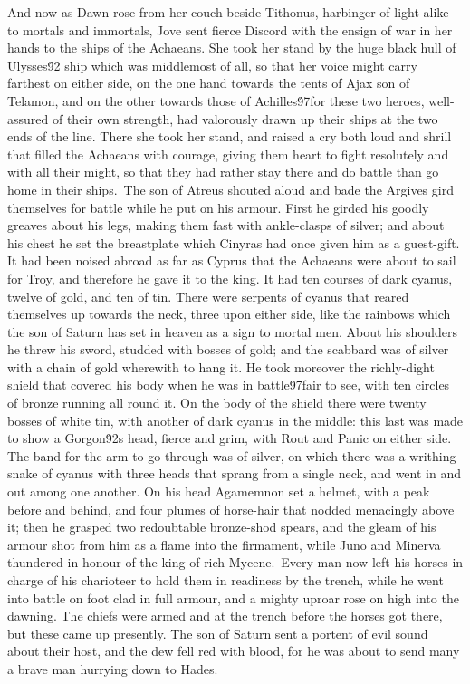 {  And now as Dawn rose from her couch beside Tithonus, harbinger of light alike to mortals and immortals, Jove sent fierce Discord with the ensign of war in her hands to the ships of the Achaeans. She took her stand by the huge black hull of Ulysses\'92 ship which was middlemost of all, so that her voice might carry farthest on either side, on the one hand towards the tents of Ajax son of Telamon, and on the other towards those of Achilles\'97for these two heroes, well-assured of their own strength, had valorously drawn up their ships at the two ends of the line. There she took her stand, and raised a cry both loud and shrill that filled the Achaeans with courage, giving them heart to fight resolutely and with all their might, so that they had rather stay there and do battle than go home in their ships.\
The son of Atreus shouted aloud and bade the Argives gird themselves for battle while he put on his armour. First he girded his goodly greaves about his legs, making them fast with ankle-clasps of silver; and about his chest he set the breastplate which Cinyras had once given him as a guest-gift. It had been noised abroad as far as Cyprus that the Achaeans were about to sail for Troy, and therefore he gave it to the king. It had ten courses of dark cyanus, twelve of gold, and ten of tin. There were serpents of cyanus that reared themselves up towards the neck, three upon either side, like the rainbows which the son of Saturn has set in heaven as a sign to mortal men. About his shoulders he threw his sword, studded with bosses of gold; and the scabbard was of silver with a chain of gold wherewith to hang it. He took moreover the richly-dight shield that covered his body when he was in battle\'97fair to see, with ten circles of bronze running all round it. On the body of the shield there were twenty bosses of white tin, with another of dark cyanus in the middle: this last was made to show a Gorgon\'92s head, fierce and grim, with Rout and Panic on either side. The band for the arm to go through was of silver, on which there was a writhing snake of cyanus with three heads that sprang from a single neck, and went in and out among one another. On his head Agamemnon set a helmet, with a peak before and behind, and four plumes of horse-hair that nodded menacingly above it; then he grasped two redoubtable bronze-shod spears, and the gleam of his armour shot from him as a flame into the firmament, while Juno and Minerva thundered in honour of the king of rich Mycene.\
Every man now left his horses in charge of his charioteer to hold them in readiness by the trench, while he went into battle on foot clad in full armour, and a mighty uproar rose on high into the dawning. The chiefs were armed and at the trench before the horses got there, but these came up presently. The son of Saturn sent a portent of evil sound about their host, and the dew fell red with blood, for he was about to send many a brave man hurrying down to Hades.\
}
